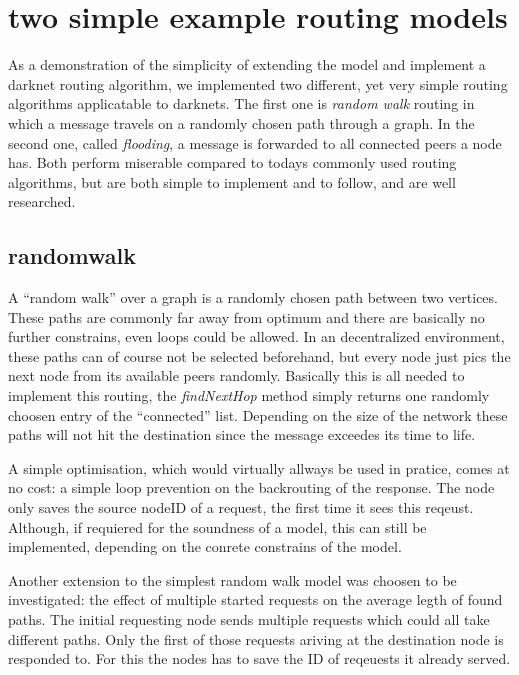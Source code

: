 \section{two simple example routing models}

As a demonstration of the simplicity of extending the model and implement a darknet routing algorithm, we implemented two different, yet very simple routing algorithms applicatable to darknets. The first one is \emph{random walk} routing in which a message travels on a randomly chosen path through a graph. In the second one, called \emph{flooding}, a message is forwarded to all connected peers a node has. Both perform miserable compared to todays commonly used routing algorithms, but are both simple to implement and to follow, and are well researched.

\subsection{randomwalk}

A ``random walk'' over a graph is a randomly chosen path between two vertices. These paths are commonly far away from optimum and there are basically no further constrains, even loops could be allowed. In an decentralized environment, these paths can of course not be selected beforehand, but every node just pics the next node from its available peers randomly. Basically this is all needed to implement this routing, the \emph{findNextHop} method simply returns one randomly choosen entry of the ``connected'' list. Depending on the size of the network these paths will not hit the destination since the message exceedes its time to life.

A simple optimisation, which would virtually allways be used in pratice, comes at no cost: a simple loop prevention on the backrouting of the response. The node only saves the source nodeID of a request, the first time it sees this reqeust. Although, if requiered for the soundness of a model, this can still be implemented, depending on the conrete constrains of the model.

Another extension to the simplest random walk model was choosen to be investigated: the effect of multiple started requests on the average legth of found paths. The initial requesting node sends multiple requests which could all take different paths. Only the first of those requests ariving at the destination node is responded to. For this the nodes has to save the ID of reqeuests it already served.

